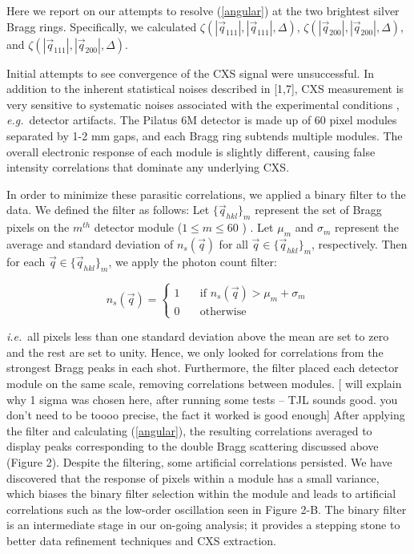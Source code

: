 \documentclass [11pt,fleqn]{article}
\begin{document}
Here we report on our attempts to resolve (\ref{angular}) at the two brightest silver Bragg rings. Specifically, we calculated $\zeta (|\vec{q}_{111}|,|\vec{q}_{111}|, \Delta  )$, $\zeta (|\vec{q}_{200}|,|\vec{q}_{200}|, \Delta  )$, and $\zeta (|\vec{q}_{111}|,|\vec{q}_{200}|, \Delta  )$. 

Initial attempts to see convergence of the CXS signal were unsuccessful. In addition to the inherent statistical noises described in [1,7], CXS measurement  is very sensitive to systematic noises associated with the experimental conditions \cite{Kam:1981ua}, \textit{e.g.}~detector artifacts. The Pilatus 6M detector is made up of 60 pixel modules separated by 1-2 mm gaps, and each Bragg ring subtends multiple modules. The overall electronic response of each module is slightly different, causing false intensity correlations that dominate any underlying CXS. 

In order to minimize these parasitic correlations, we applied a binary filter to the data. We defined the filter as follows: Let $\{ \vec{q}_{hkl} \}_{m}$ represent the set of Bragg pixels on the $m^{th}$ detector module ($1 \leq m \leq 60$ ) . Let $\mu_m$ and $\sigma_m$ represent the average and standard deviation of $n_{s}(\vec{q})$  for all $\vec{q} \in \{ \vec{q}_{hkl} \}_{m} $, respectively. Then for each $\vec{q} \in \{ \vec{q}_{hkl} \}_{m} $, we apply the photon count filter:

\[  n_{s}(\vec{q} ) = 
 \begin{cases} 
   1 & \quad \text{if } n_{s}(\vec{q} ) > \mu_m +  \sigma_m\\
   0 & \quad \text{otherwise} 
 \end{cases} 
 \]

\textit{i.e.}~all pixels less than one standard deviation above the mean are set to zero and the rest are set to unity. Hence, we only looked for correlations from the strongest Bragg peaks in each shot. Furthermore, the filter placed each detector module on the same scale, removing correlations between modules. [  will explain why 1 sigma was chosen here, after running some tests -- TJL sounds good. you don't need to be toooo precise, the fact it worked is good enough]  After applying the filter and calculating (\ref{angular}), the resulting correlations averaged to display peaks corresponding to the double Bragg scattering discussed above (Figure 2). Despite the filtering, some artificial correlations persisted. We have discovered that the response of pixels within a module has a small variance,  which biases the binary filter selection within the module and leads to artificial correlations such as the low-order oscillation seen in Figure 2-B. The binary filter is an intermediate stage in our on-going analysis; it provides a stepping stone to better data refinement techniques and CXS extraction.
\end{document}
